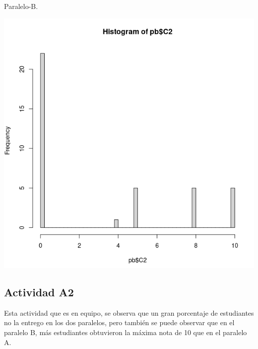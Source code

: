 \documentclass[a4pa<per,12pt,spanish]{article}
\begin{document}
\begin{minipage}[h]{0.45\linewidth}
Paralelo-B.

\includegraphics[scale=0.3]{images/histo-PB-C2.png}
\end{minipage}





\subsection{Actividad A2}
\label{sec:actividad-A2}
Esta actividad que es en equipo, se observa que un gran porcentaje de estudiantes no la entrego en los dos paralelos, pero también se puede observar que en el paralelo B, más estudiantes obtuvieron la máxima nota de 10 que en el paralelo A.\\
\end{document}
